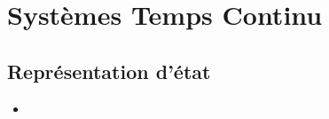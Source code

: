 \documentclass[11pt,a4paper]{article}
\begin{document}
\section{Systèmes Temps Continu}
\subsection{Représentation d'état}
\begin{itemize}
\item 
\end{itemize}
\end{document}
